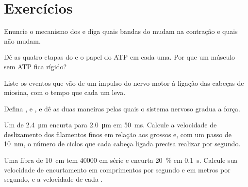 \section{Exercícios}

\begin{exercise}[$\star$]\label{exo:b2:muscle-movement:1}
Enuncie o mecanismo dos  e diga quais bandas do
 mudam na contração e quais não mudam.
\end{exercise}

\begin{exercise}[$\star$]\label{exo:b2:muscle-movement:2}
Dê as quatro etapas do  e o papel do ATP em
cada uma. Por que um músculo sem ATP fica rígido?
\end{exercise}

\begin{exercise}[$\star$]\label{exo:b2:muscle-movement:3}
Liste os eventos que vão de um impulso do nervo motor à ligação das
cabeças de miosina, com o tempo que cada um leva.
\end{exercise}

\begin{exercise}[$\star$]\label{exo:b2:muscle-movement:4}
Defina ,  e , e dê as duas maneiras pelas quais
o sistema nervoso gradua a força.
\end{exercise}

\begin{exercise}[$\star\star$]\label{exo:b2:muscle-movement:5}
Um  de \qty{2.4}{\micro m} encurta para \qty{2.0}{\micro m} em
\qty{50}{ms}. Calcule a velocidade de deslizamento dos filamentos finos
em relação aos grossos e, com um passo de \qty{10}{nm}, o número de
ciclos que cada cabeça ligada precisa realizar por segundo.
\end{exercise}

\begin{exercise}[$\star\star$]\label{exo:b2:muscle-movement:6}
Uma fibra de \qty{10}{cm} tem \num{40000}  em série e encurta
\qty{20}{\%} em \qty{0.1}{s}. Calcule sua velocidade de encurtamento em
comprimentos por segundo e em metros por segundo, e a velocidade de cada
.
\end{exercise}

